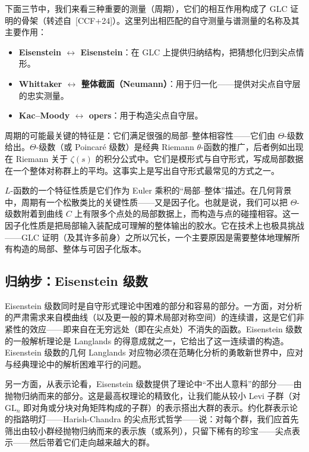 下面三节中，我们来看三种重要的测量（周期），它们的相互作用构成了 GLC 证明的骨架（转述自~[CCF+24]）。这里列出相匹配的自守测量与谱测量的名称及其主要作用：

\begin{itemize}
\item \textbf{Eisenstein $\leftrightarrow$ Eisenstein}：在 GLC 上提供归纳结构，把猜想化归到尖点情形。
\item \textbf{Whittaker $\leftrightarrow$ 整体截面（Neumann）}：用于归一化——提供对尖点自守层的忠实测量。
\item \textbf{Kac–Moody $\leftrightarrow$ opers}：用于构造尖点自守层。
\end{itemize}

周期的可能最关键的特征是：它们满足很强的局部–整体相容性——它们由 $\Theta$-级数给出。$\Theta$-级数（或 Poincaré 级数）是经典 Riemann $\theta$-函数的推广，后者例如出现在 Riemann 关于 $\zeta(s)$ 的积分公式中。它们是模形式与自守形式，写成局部数据在一个整体对称群上的平均。这事实上是写出自守形式最常见的方式之一。

$L$-函数的一个特征性质是它们作为 Euler 乘积的“局部–整体”描述。在几何背景中，周期有一个松散类比的关键性质——又是因子化。也就是说，我们可以把 $\Theta$-级数附着到曲线 $C$ 上有限多个点处的局部数据上，而构造与点的碰撞相容。这一因子化性质是把局部输入装配成可理解的整体输出的胶水。它在技术上也极具挑战——GLC 证明（及其许多前身）之所以冗长，一个主要原因是需要整体地理解所有构造的局部、整体与可因子化版本。

\subsection{归纳步：Eisenstein 级数}\label{sec:5.3}

Eisenstein 级数同时是自守形式理论中困难的部分和容易的部分。一方面，对分析的严肃需求来自模曲线（以及更一般的算术局部对称空间）的连续谱，这是它们非紧性的效应——即来自在无穷远处（即在尖点处）不消失的函数。Eisenstein 级数的一般解析理论是 Langlands 的得意成就之一，它给出了这一连续谱的构造。Eisenstein 级数的几何 Langlands 对应物必须在范畴化分析的勇敢新世界中，应对与经典理论中的解析困难平行的问题。

另一方面，从表示论看，Eisenstein 级数提供了理论中“不出人意料”的部分——由抛物归纳而来的部分。这是最高权理论的精致化，让我们能从较小 Levi 子群（对 $\mathrm{GL}_{n}$ 即对角或分块对角矩阵构成的子群）的表示搭出大群的表示。约化群表示论的指路明灯——Harish-Chandra 的尖点形式哲学——说：对每个群，我们应首先筛出由较小群经抛物归纳而来的表示族（或系列），只留下稀有的珍宝——尖点表示——然后带着它们走向越来越大的群。


